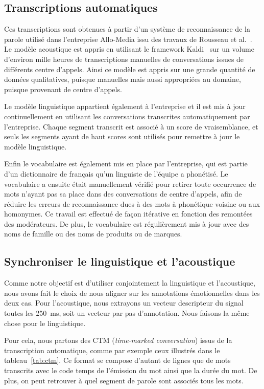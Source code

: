 \subsection{Transcriptions automatiques}
Ces transcriptions sont obtenues à partir d'un système de reconnaissance de la parole utilisé dans l'entreprise Allo-Media issu des travaux de Rousseau et al.~\cite{Rousseau2014}. Le modèle acoustique est appris en utilisant le framework Kaldi~\cite{Povey2011} sur un volume d'environ mille heures de transcriptions manuelles de conversations issues de différents centre d'appels. Ainsi ce modèle est appris sur une grande quantité de données qualitatives, puisque manuelles mais aussi appropriées au domaine, puisque provenant de centre d'appels.

Le modèle linguistique appartient également à l'entreprise et il est mis à jour continuellement en utilisant les conversations transcrites automatiquement par l'entreprise. Chaque segment transcrit est associé à un score de vraisemblance, et seuls les segments ayant de haut scores sont utilisés pour remettre à jour le modèle linguistique.

Enfin le vocabulaire est également mis en place par l'entreprise, qui est partie d'un dictionnaire de français qu'un linguiste de l'équipe a phonétisé. Le vocabulaire a ensuite était manuellement vérifié pour retirer toute occurrence de mots n'ayant pas sa place dans des conversations de centre d'appels, afin de réduire les erreurs de reconnaissance dues à des mots à phonétique voisine ou aux homonymes. Ce travail est effectué de façon itérative en fonction des remontées des modérateurs. De plus, le vocabulaire est régulièrement mis à jour avec des noms de famille ou des noms de produits ou de marques.

\subsection{Synchroniser le linguistique et l'acoustique}
Comme notre objectif est d'utiliser conjointement la linguistique et l'acoustique, nous avons fait le choix de nous aligner sur les annotations émotionnelles dans les deux cas. Pour l'acoustique, nous extrayons un vecteur descripteur du signal toutes les 250~ms, soit un vecteur par pas d'annotation. Nous faisons la même chose pour le linguistique.

Pour cela, nous partons des CTM (\textit{time-marked conversation}) issus de la transcription automatique, comme par exemple ceux illustrés dans le tableau~\ref{tab:ctm}. Ce format se compose d'autant de lignes que de mots transcrits avec le code temps de l'émission du mot ainsi que la durée du mot. De plus, on peut retrouver à quel segment de parole sont associés tous les mots.

